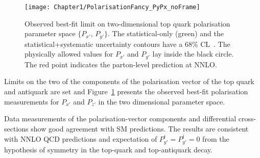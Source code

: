 \begin{figure}[h]
    \centering
    \texttt{[image: Chapter1/PolarisationFancy\_PyPx\_noFrame]}
    \caption{Observed best-fit limit on two-dimensional top quark polarisation
    parameter space $\{P_{x'},\, P_{y'}\}$. The statistical-only (green)
    and the statistical+systematic uncertainty contours have a 68\% CL~\cite{ATLAS:2022vym}.
    The physically allowed values for $P_{x'}$ and $P_{y'}$  lay inside the black circle. 
    The red point indicates the parton-level prediction at NNLO.}
    \label{fig:Chap1:Polarisation:Result}
\end{figure}


Limits on the two of the components of the polarisation vector of the
top quark and antiquark are set and Figure~\ref{fig:Chap1:Polarisation:Result}
presents the observed best-fit polarisation measurements for $P_{x'}$ and $P_{z'}$ in the
two dimensional parameter space.

Data measurements of the polarisation-vector components and 
differential cross-sections show good agreement with SM predictions.
 The results are consistent with NNLO QCD predictions and expectation of
$P_{y'}^{t} = P_{y'}^{\bar{t}} = 0$ from the hypothesis of \CP symmetry 
in the top-quark and top-antiquark decay. 





